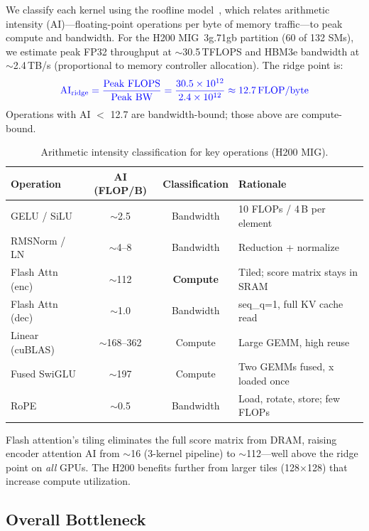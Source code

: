 \documentclass{article}
\newcommand{\chg}[1]{{\color{blue}#1}}
\begin{document}
We classify each kernel using the roofline model~\citep{williams2009roofline}, which relates arithmetic intensity (AI)---floating-point operations per byte of memory traffic---to peak compute and bandwidth.  For the H200 MIG~3g.71gb partition (60 of 132 SMs), we estimate peak FP32 throughput at $\sim$30.5\,TFLOPS and HBM3e bandwidth at $\sim$2.4\,TB/s (proportional to memory controller allocation).  The ridge point is:
\begin{equation}
\chg{\text{AI}_{\text{ridge}} = \frac{\text{Peak FLOPS}}{\text{Peak BW}} = \frac{30.5 \times 10^{12}}{2.4 \times 10^{12}} \approx 12.7 \text{\,FLOP/byte}}
\end{equation}
Operations with AI $<$ 12.7 are bandwidth-bound; those above are compute-bound.

\begin{table}[h]
\centering
\caption{Arithmetic intensity classification for key operations (H200 MIG).}
\label{tab:ai}
\small
\begin{tabular}{@{}lccl@{}}
\toprule
\textbf{Operation} & \textbf{AI (FLOP/B)} & \textbf{Classification} & \textbf{Rationale} \\
\midrule
GELU / SiLU & $\sim$2.5 & Bandwidth & 10 FLOPs / 4\,B per element \\
RMSNorm / LN & $\sim$4--8 & Bandwidth & Reduction + normalize \\
Flash Attn (enc) & $\sim$112 & \textbf{Compute} & Tiled; score matrix stays in SRAM \\
Flash Attn (dec) & $\sim$1.0 & Bandwidth & seq\_q=1, full KV cache read \\
Linear (cuBLAS) & $\sim$168--362 & Compute & Large GEMM, high reuse \\
Fused SwiGLU & $\sim$197 & Compute & Two GEMMs fused, x loaded once \\
RoPE & $\sim$0.5 & Bandwidth & Load, rotate, store; few FLOPs \\
\bottomrule
\end{tabular}
\end{table}

Flash attention's tiling eliminates the full score matrix from DRAM, raising encoder attention AI from $\sim$16 (3-kernel pipeline) to $\sim$112---well above the ridge point on \emph{all} GPUs.  The H200 benefits further from larger tiles (128$\times$128) that increase compute utilization.

\subsection{Overall Bottleneck}
\end{document}
